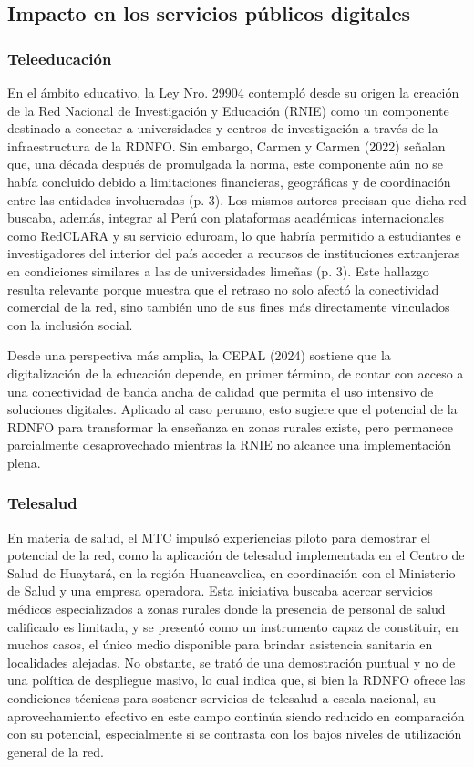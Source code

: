\subsection{Impacto en los servicios públicos digitales}
\subsubsection{Teleeducación}
En el ámbito educativo, la Ley Nro. 29904 contempló desde su origen la creación de la Red Nacional de Investigación y Educación (RNIE) como un componente destinado a conectar a universidades y centros de investigación a través de la infraestructura de la RDNFO. Sin embargo, Carmen y Carmen (2022) señalan que, una década después de promulgada la norma, este componente aún no se había concluido debido a limitaciones financieras, geográficas y de coordinación entre las entidades involucradas (p. 3). Los mismos autores precisan que dicha red buscaba, además, integrar al Perú con plataformas académicas internacionales como RedCLARA y su servicio eduroam, lo que habría permitido a estudiantes e investigadores del interior del país acceder a recursos de instituciones extranjeras en condiciones similares a las de universidades limeñas (p. 3). Este hallazgo resulta relevante porque muestra que el retraso no solo afectó la conectividad comercial de la red, sino también uno de sus fines más directamente vinculados con la inclusión social.

Desde una perspectiva más amplia, la CEPAL (2024) sostiene que la digitalización de la educación depende, en primer término, de contar con acceso a una conectividad de banda ancha de calidad que permita el uso intensivo de soluciones digitales. Aplicado al caso peruano, esto sugiere que el potencial de la RDNFO para transformar la enseñanza en zonas rurales existe, pero permanece parcialmente desaprovechado mientras la RNIE no alcance una implementación plena.

\subsubsection{Telesalud}
En materia de salud, el MTC impulsó experiencias piloto para demostrar el potencial de la red, como la aplicación de telesalud implementada en el Centro de Salud de Huaytará, en la región Huancavelica, en coordinación con el Ministerio de Salud y una empresa operadora. Esta iniciativa buscaba acercar servicios médicos especializados a zonas rurales donde la presencia de personal de salud calificado es limitada, y se presentó como un instrumento capaz de constituir, en muchos casos, el único medio disponible para brindar asistencia sanitaria en localidades alejadas. No obstante, se trató de una demostración puntual y no de una política de despliegue masivo, lo cual indica que, si bien la RDNFO ofrece las condiciones técnicas para sostener servicios de telesalud a escala nacional, su aprovechamiento efectivo en este campo continúa siendo reducido en comparación con su potencial, especialmente si se contrasta con los bajos niveles de utilización general de la red.

